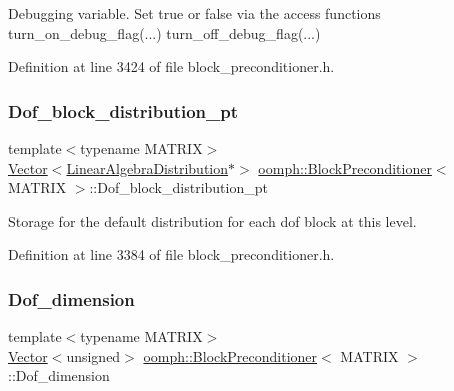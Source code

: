 Debugging variable. Set true or false via the access functions turn\+\_\+on\+\_\+debug\+\_\+flag(...) turn\+\_\+off\+\_\+debug\+\_\+flag(...) 



Definition at line 3424 of file block\+\_\+preconditioner.\+h.

\mbox{\label{classoomph_1_1BlockPreconditioner_a21867eb330dd1177c530a590ad1fa571}} 
\subsubsection{\texorpdfstring{Dof\+\_\+block\+\_\+distribution\+\_\+pt}{Dof\_block\_distribution\_pt}}
{\footnotesize\ttfamily template$<$typename M\+A\+T\+R\+IX$>$ \\
\hyperlink{classoomph_1_1Vector}{Vector}$<$\hyperlink{classoomph_1_1LinearAlgebraDistribution}{Linear\+Algebra\+Distribution}$\ast$$>$ \hyperlink{classoomph_1_1BlockPreconditioner}{oomph\+::\+Block\+Preconditioner}$<$ M\+A\+T\+R\+IX $>$\+::Dof\+\_\+block\+\_\+distribution\+\_\+pt\hspace{0.3cm}{\ttfamily [protected]}}



Storage for the default distribution for each dof block at this level. 



Definition at line 3384 of file block\+\_\+preconditioner.\+h.

\mbox{\label{classoomph_1_1BlockPreconditioner_a55900a517c9e354b9fc49624483b7273}} 
\subsubsection{\texorpdfstring{Dof\+\_\+dimension}{Dof\_dimension}}
{\footnotesize\ttfamily template$<$typename M\+A\+T\+R\+IX$>$ \\
\hyperlink{classoomph_1_1Vector}{Vector}$<$unsigned$>$ \hyperlink{classoomph_1_1BlockPreconditioner}{oomph\+::\+Block\+Preconditioner}$<$ M\+A\+T\+R\+IX $>$\+::Dof\+\_\+dimension\hspace{0.3cm}{\ttfamily [private]}}



